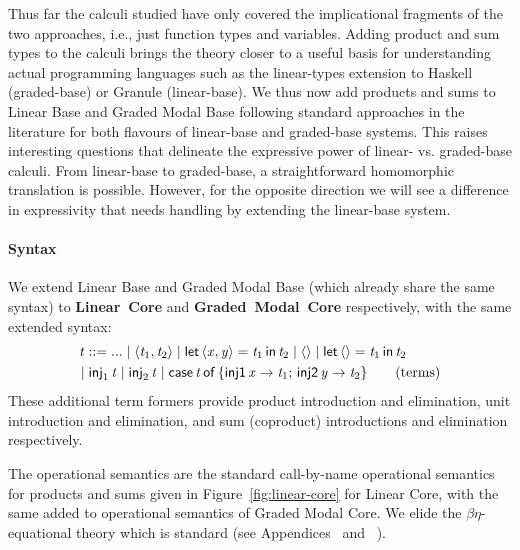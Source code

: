 Thus far the calculi studied have only covered the implicational
fragments of the two approaches, i.e., just function types and
variables.  Adding product and sum types to the calculi brings the
theory closer to a useful basis for understanding actual
programming languages such as the linear-types extension to Haskell (graded-base) or Granule
(linear-base).
We thus now add products and sums to Linear Base and Graded Modal Base
following standard approaches in the literature for both flavours
of linear-base and graded-base systems.  This raises interesting questions
that delineate the expressive power of linear- vs. graded-base
calculi. From linear-base to graded-base, a straightforward
homomorphic translation is possible. However, for the opposite
direction we will see a difference in expressivity that needs handling
by extending the linear-base system.

\paragraph{Syntax} We extend Linear Base and Graded Modal Base (which already share the same
syntax) to \textbf{Linear~Core} and \textbf{Graded~Modal~Core} respectively, with the same extended syntax:
%
\begin{align*}
  \mathit{t} & ::= ... \mid  \langle  \mathit{t_{{\mathrm{1}}}} ,  \mathit{t_{{\mathrm{2}}}}  \rangle  \mid  \mathsf{let} \, \langle  \mathit{x} ,  \mathit{y}  \rangle =  \mathit{t_{{\mathrm{1}}}}  \, \mathsf{in} \,  \mathit{t_{{\mathrm{2}}}}  \mid  \langle \rangle  \mid  \mathsf{let} \, \langle \rangle =  \mathit{t_{{\mathrm{1}}}}  \, \mathsf{in} \,  \mathit{t_{{\mathrm{2}}}}  \\
         \mid & \; \mathsf{inj}_1 \,  \mathit{t}  \mid  \mathsf{inj}_2 \,  \mathit{t}  \mid  \mathsf{case} \,  \mathit{t}  \, \mathsf{of} \, \{ \mathsf{inj1} \,  \mathit{x}  \rightarrow  \mathit{t_{{\mathrm{1}}}}  ; \, \mathsf{inj2} \,  \mathit{y}  \rightarrow  \mathit{t_{{\mathrm{2}}}}  \} 
  \tag{terms}
\end{align*}
%
These additional term formers provide product introduction and elimination, unit introduction
and elimination, and sum (coproduct) introductions and elimination respectively.

The operational semantics are the standard call-by-name operational semantics for products and sums given in Figure~\ref{fig:linear-core} for Linear Core, with the same
added to operational semantics of Graded Modal Core. We elide the $\beta\eta$-equational theory which is standard (see Appendices~ and
~).

